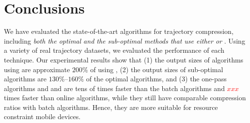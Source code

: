 \vspace{-1ex}
\section{Conclusions}

We have evaluated the state-of-the-art \lsa algorithms for trajectory compression, including \emph{both the optimal and the sub-optimal methods that use either \ped or \sed}. 
Using a variety of real trajectory datasets, we evaluated the performance of each technique.%
Our experimental results show that 
(1) the output sizes of algorithms using \sed are approximate $200\%$ of using \ped, 
(2) the output sizes of sub-optimal algorithms are $130\%$--$160\%$ of the optimal algorithms, and 
(3) the one-pass algorithms \siped and \operb and \cised are tens of times faster than the batch algorithms and \textcolor{red}{$xxx$} times faster than online algorithms, while they still have comparable compression ratios with batch algorithms. Hence, they are more suitable for resource constraint mobile devices.